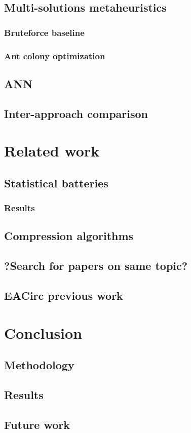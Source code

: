 \documentclass[
  print, %
  Table,   %
  nolof,     %
  nolot,     %
  11pt, %
  oneside  %
]{fithesis3}
\begin{document}
\section{Multi-solutions metaheuristics}
\label{sec:res-ms}
\subsection{Bruteforce baseline}
\label{subsec:res-ms-bruteforce}
\subsection{Ant colony optimization}
\label{subsec:res-ms-aco}

\section{ANN}
\label{sec:res-ann}

\section{Inter-approach comparison}
\label{sec:res-comp}

\chapter{Related work}
\label{chap:relatwork}

\section{Statistical batteries}
\label{sec:relatwork-stat}

\subsection{Results}
\label{subsec:relatwork-stat-res}

\section{Compression algorithms}
\label{sec:relatwork-compress}

\section{?Search for papers on same topic?}
\label{sec:relatwork-paper}

\section{EACirc previous work}
\label{sec:relatwork-eac}

\chapter{Conclusion}
\label{chap:conclusion}

\section{Methodology}
\label{sec:conclusion-method}
\section{Results}
\label{sec:conclusion-results}
\section{Future work}
\label{sec:conclusion-future}
\end{document}
